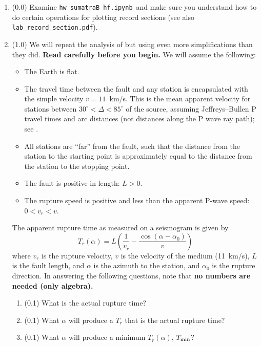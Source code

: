 \documentclass[11pt,titlepage,fleqn]{article}
\newcommand{\tfilehf}{{\tt hw\_sumatraB\_hf.ipynb}}
\begin{document}
\begin{enumerate}
\item (0.0) Examine \tfilehf\ and make sure you understand how to do certain operations for plotting record sections (see also \verb+lab_record_section.pdf+).

\item (1.0) We will repeat the analysis of \citet{Ni2005} but using even more simplifications than they did. {\bf Read \citet{Ni2005} carefully before you begin.} We will assume the following:
%
\begin{itemize}
\item The Earth is flat.
\item The travel time between the fault and any station is encapsulated with the simple velocity $v = 11$~km/s. This is the mean apparent velocity for stations between $30^\circ < \Delta < 85^\circ$ of the source, assuming Jeffreys--Bullen P travel times and arc distances (not distances along the P wave ray path); see .
\item All stations are ``far'' from the fault, such that the distance from the station to the starting point is approximately equal to the distance from the station to the stopping point.
\item The fault is positive in length: $L > 0$.
\item The rupture speed is positive and less than the apparent P-wave speed: $0 < v_r < v$.
\end{itemize}
%
The apparent rupture time as measured on a seismogram is given by \citep[][Section 4.3.2]{SteinWysession}
%
\begin{equation}
T_r(\alpha) = L\left(\frac{1}{v_r} - \frac{\cos(\alpha-\alpha_0)}{v}\right)
\label{Tr}
\end{equation}
%
where $v_r$ is the rupture velocity, $v$ is the velocity of the medium (11~km/s), $L$ is the fault length, and $\alpha$ is the azimuth to the station, and $\alpha_0$ is the rupture direction. In answering the following questions, note that {\bf no numbers are needed (only algebra).}
%
\begin{enumerate}
\item (0.1) What is the actual rupture time?
\item (0.1) What $\alpha$ will produce a $T_r$ that is the actual rupture time?
\item (0.1) What $\alpha$ will produce a minimum $T_r(\alpha)$, $T_{\rm min}$?

\end{enumerate}
\end{enumerate}
\end{document}
